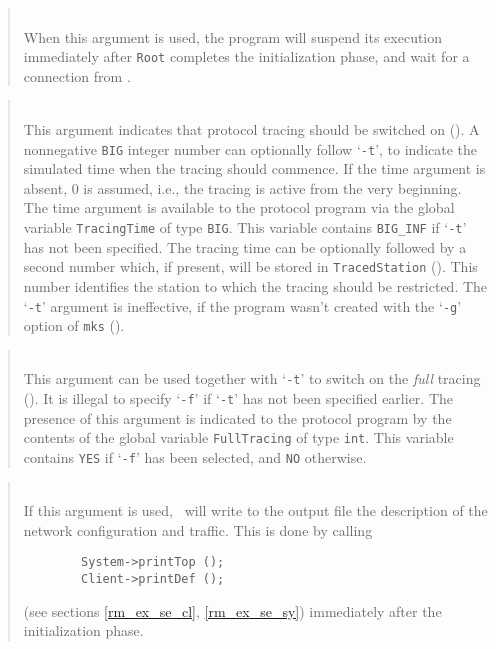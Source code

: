\begin{quote}
\noindent{}\\ \hspace{0in}
When this argument is used, the program will suspend its execution
immediately after {\tt Root} completes the initialization phase,
and wait for a connection from \dsd.
\end{quote}

\begin{quote}
\noindent{}\\ \hspace{0in}
This argument indicates that protocol tracing should be switched on
().
A nonnegative {\tt BIG} integer number can optionally follow `{\tt -t}',
to indicate the simulated time when the tracing should commence.
If the time argument is absent, 0 is assumed, i.e.,
the tracing is active from the very beginning.
The time argument is available to the protocol program via the global
variable {\tt TracingTime} of type {\tt BIG}.
This variable contains {\tt BIG\_INF} if `{\tt -t}' has not been specified.
The tracing time can be optionally followed by a second number which,
if present, will be stored in {\tt TracedStation} ().
This number identifies the station to which the tracing should be
restricted.
The `{\tt -t}' argument is ineffective, if the program wasn't created
with the `{\tt -g}' option of {\tt mks} ().
\end{quote}

\begin{quote}
\noindent{}\\ \hspace{0in}
This argument can be used together with `{\tt -t}' to switch on the
{\em full\/} tracing ().
It is illegal to specify `{\tt -f}' if `{\tt -t}' has not been specified
earlier.
The presence of this argument is indicated to the protocol program by the
contents of the global variable {\tt FullTracing} of type {\tt int}.
This variable contains {\tt YES} if `{\tt -f}' has been selected, and
{\tt NO} otherwise.
\end{quote}

\begin{quote}
\noindent{}\\ \hspace{0in}
If this argument is used, \smurph\ will write to the
output file the description of the network configuration and traffic.
This is done by calling
\begin{verbatim}
        System->printTop ();
        Client->printDef ();
\end{verbatim}
(see sections \ref{rm_ex_se_cl}, \ref{rm_ex_se_sy}) immediately after the
initialization phase.
\end{quote}

